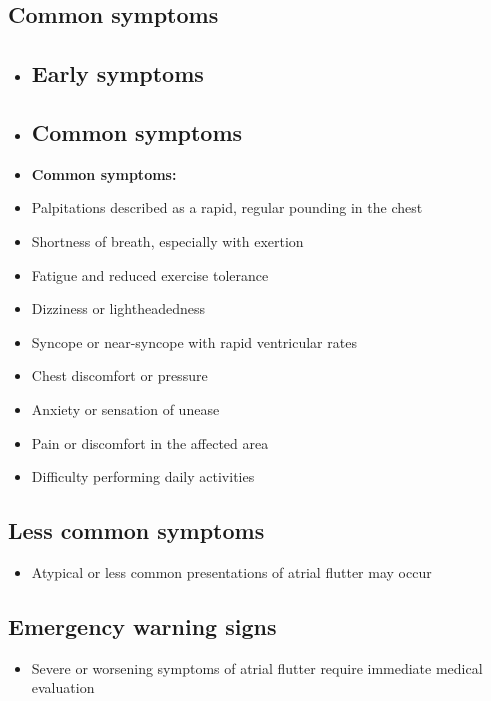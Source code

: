 \subsection{Common symptoms}
\begin{itemize}[noitemsep]
  \item \subsection{Early symptoms}
  \item \subsection{Common symptoms}
  \item \textbf{Common symptoms:}
  \item Palpitations described as a rapid, regular pounding in the chest
  \item Shortness of breath, especially with exertion
  \item Fatigue and reduced exercise tolerance
  \item Dizziness or lightheadedness
  \item Syncope or near-syncope with rapid ventricular rates
  \item Chest discomfort or pressure
  \item Anxiety or sensation of unease
  \item Pain or discomfort in the affected area
  \item Difficulty performing daily activities
\end{itemize}

\subsection{Less common symptoms}
\begin{itemize}[noitemsep]
  \item Atypical or less common presentations of atrial flutter may occur
\end{itemize}

\subsection{Emergency warning signs}
\begin{itemize}[noitemsep]
  \item Severe or worsening symptoms of atrial flutter require immediate medical evaluation
\end{itemize}
